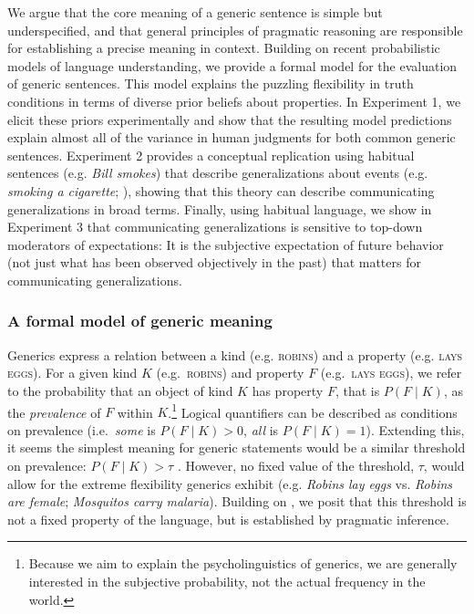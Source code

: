 \documentclass[11pt,letterpaper]{article}
\begin{document}

We argue that the core meaning of a generic sentence is simple but underspecified, and that general principles of pragmatic reasoning are responsible for establishing a precise meaning in context. 
Building on recent probabilistic models of language understanding, we provide a formal model for the evaluation of generic sentences. 
This model explains the puzzling flexibility in truth conditions in terms of diverse prior beliefs about properties.
In Experiment 1, we elicit these priors experimentally and show that the resulting model predictions explain almost all of the variance in human judgments for both common generic sentences.
Experiment 2 provides a conceptual replication using habitual sentences (e.g. \emph{Bill smokes}) that describe generalizations about events (e.g. \emph{smoking a cigarette}; ), showing that this theory can describe communicating generalizations in broad terms.
Finally, using habitual language, we show in Experiment 3 that communicating generalizations is sensitive to top-down moderators of expectations: It is the subjective expectation of future behavior (not just what has been observed objectively in the past) that matters for communicating generalizations.

\subsubsection*{A formal model of generic meaning}

Generics express a relation between a kind (e.g. \textsc{robins}) and a property (e.g. \textsc{lays eggs}). 
For a given kind $K$ (e.g.~\textsc{robins}) and property $F$ (e.g.~\textsc{lays eggs}), we refer to the probability that an object of kind $K$ has property $F$, that is $P(F\mid K)$, as the \emph{prevalence} of $F$ within $K$.\footnote{Because we aim to explain the psycholinguistics of generics, we are generally interested in the subjective probability, not the actual frequency in the world.}
Logical quantifiers can be described as conditions on prevalence (i.e.~\emph{some} is $P(F\mid K)>0$, \emph{all} is $P(F\mid K)=1$). 
Extending this, it seems the simplest meaning for generic statements would be a similar threshold on prevalence: $P(F\mid K)>\tau$ \cite{Cohen1999}. 
However, no fixed value of the threshold, $\tau$, would allow for the extreme flexibility generics exhibit (e.g. \emph{Robins lay eggs} vs. \emph{Robins are female}; \emph{Mosquitos carry malaria}).
Building on , we posit that this threshold is not a fixed property of the language, but is established by pragmatic inference.
\end{document}
